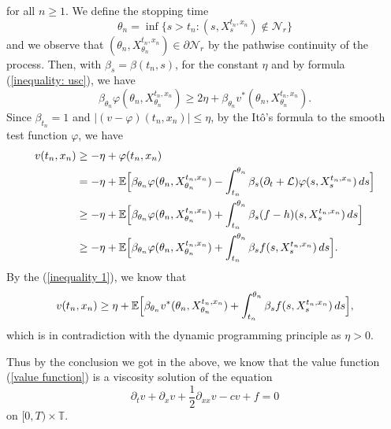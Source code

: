 \documentclass[12pt,a4paper]{ctexart}
\begin{document}
for all $n \geq 1$. We define the stopping time
\begin{equation*}
    \theta_{n} = \inf \{s > t_n : (s, X_{s}^{t_n, x_n}) \notin \mathcal{N}_{r} \}
\end{equation*}
and we observe that $(\theta_{n}, X_{\theta_{n}}^{t_n, x_n}) \in \partial \mathcal{N}_{r}$ by the pathwise continuity of the process. Then, with $\beta_{s} = \beta(t_n, s)$, for the constant $\eta$ and by formula (\ref{inequality: usc}), we have
\begin{equation} \label{inequality 1}
    \beta_{\theta_{n}} \varphi(\theta_{n}, X_{\theta_n}^{t_n, x_n}) \geq 2 \eta + \beta_{\theta_n} v^{*} (\theta_{n}, X_{\theta_n}^{t_n, x_n}).
\end{equation}
Since $\beta_{t_n} = 1$ and $|(v - \varphi)(t_n, x_n)| \leq \eta$, by the It\^{o}'s formula to the smooth test function $\varphi$, we have
\begin{align*}
    v(t_n, x_n) & \geq - \eta + \varphi(t_n, x_n) \\
    & = - \eta + \mathbb{E} \Big{[} \beta_{\theta_n} \varphi(\theta_n, X_{\theta_n}^{t_n, x_n}) - \int_{t_n}^{\theta_n} \beta_{s} (\partial_{t} + \mathcal{L}) \varphi(s, X_{s}^{t_n, x_n}) \, d s \Big{]} \\
    & \geq - \eta + \mathbb{E} \Big{[} \beta_{\theta_n} \varphi(\theta_n, X_{\theta_n}^{t_n, x_n}) + \int_{t_n}^{\theta_n} \beta_{s} (f - h) (s, X_{s}^{t_n, x_n}) \, d s \Big{]} \\
    & \geq - \eta + \mathbb{E} \Big{[} \beta_{\theta_n} \varphi(\theta_n, X_{\theta_n}^{t_n, x_n}) + \int_{t_n}^{\theta_n} \beta_{s} f(s, X_{s}^{t_n, x_n}) \, d s \Big{]} .
\end{align*}
By the (\ref{inequality 1}), we know that
\begin{equation*}
    v(t_n, x_n) \geq \eta + \mathbb{E} \Big{[} \beta_{\theta_n} v^{*} (\theta_n, X_{\theta_n}^{t_n, x_n}) + \int_{t_n}^{\theta_n} \beta_{s} f(s, X_{s}^{t_n, x_n}) \, d s \Big{]},
\end{equation*}
which is in contradiction with the dynamic programming principle as $\eta > 0$.

Thus by the conclusion we got in the above, we know that the value function (\ref{value function}) is a viscosity solution of the equation
\begin{equation*}
    \partial_{t} v + \partial_{x} v + \frac{1}{2} \partial_{xx} v - c v + f = 0
\end{equation*}
on $[0, T) \times \mathbb{T}$.
\end{document}
